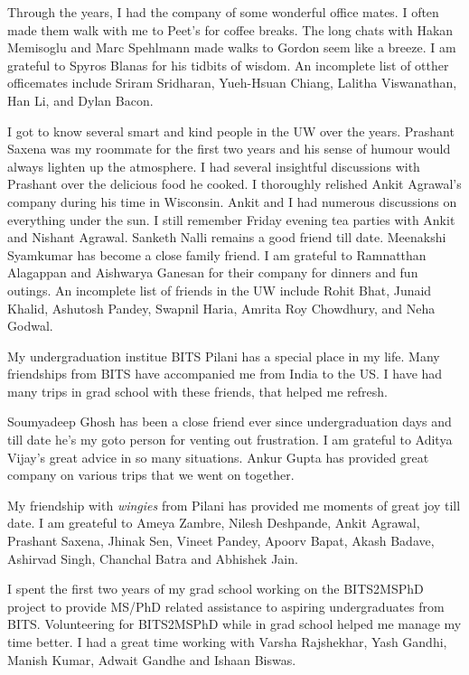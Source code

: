 Through the years, I had the company of some wonderful office mates. 
I often made them walk with me to Peet's for coffee breaks.
The long chats with Hakan Memisoglu and Marc Spehlmann made walks to Gordon seem like a breeze.
I am grateful to Spyros Blanas for his tidbits of wisdom. 
An incomplete list of otther officemates include Sriram Sridharan, Yueh-Hsuan Chiang, Lalitha Viswanathan, Han Li, and Dylan Bacon.

I got to know several smart and kind people in the UW over the years. 
Prashant Saxena was my roommate for the first two years and his sense of humour would always lighten up the atmosphere. 
I had several insightful discussions with Prashant over the delicious food he cooked. 
I thoroughly relished Ankit Agrawal's company during his time in Wisconsin.
Ankit and I had numerous discussions on everything under the sun.
I still remember Friday evening tea parties with Ankit and Nishant Agrawal. 
Sanketh Nalli remains a good friend till date.
Meenakshi Syamkumar has become a close family friend. 
I am grateful to Ramnatthan Alagappan and Aishwarya Ganesan for their company for dinners and fun outings.
An incomplete list of friends in the UW include Rohit Bhat, Junaid Khalid, Ashutosh Pandey, Swapnil Haria, Amrita Roy Chowdhury, and Neha Godwal. 

My undergraduation institue BITS Pilani has a special place in my life.
Many friendships from BITS have accompanied me from India to the US. 
I have had many trips in grad school with these friends, that helped me refresh.

Soumyadeep Ghosh has been a close friend ever since undergraduation days and till date he's my goto person for venting out frustration. 
I am grateful to Aditya Vijay's great advice in so many situations.
Ankur Gupta has provided great company on various trips that we went on together.

My friendship with \textit{wingies} from Pilani has provided me moments of great joy till date.
I am greateful to Ameya Zambre, Nilesh Deshpande, Ankit Agrawal, Prashant Saxena, Jhinak Sen, Vineet Pandey, Apoorv Bapat, Akash Badave, Ashirvad Singh, Chanchal Batra and Abhishek Jain.

I spent the first two years of my grad school working on the BITS2MSPhD project to provide MS/PhD related assistance to aspiring undergraduates from BITS. 
Volunteering for BITS2MSPhD while in grad school helped me manage my time better.
I had a great time working with Varsha Rajshekhar, Yash Gandhi, Manish Kumar, Adwait Gandhe and Ishaan Biswas. 

